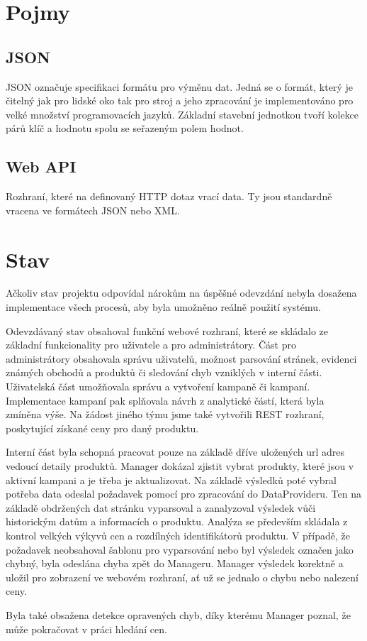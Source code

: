 \documentclass[thesis=B,czech]{FITthesis}[2012/06/26]
\begin{document}
\section{Pojmy}

\subsection{JSON}
JSON označuje specifikaci formátu pro výměnu dat\cite{JSON}. Jedná se o formát, který je čitelný jak pro lidské oko tak pro stroj\cite{JSON} a jeho zpracování je implementováno pro velké množství programovacích jazyků\cite{JSON-impl}. Základní stavební jednotkou
tvoří kolekce párů klíč a hodnotu spolu se seřazeným polem hodnot.

\subsection{Web API}
Rozhraní, které na definovaný HTTP dotaz vrací data. Ty jsou standardně vracena ve formátech JSON nebo XML.

\section{Stav}
Ačkoliv stav projektu odpovídal nárokům na úspěšné odevzdání nebyla dosažena implementace všech procesů, aby byla umožněno reálně
použití systému.
\par
Odevzdávaný stav obsahoval funkční webové rozhraní, které se skládalo ze základní funkcionality pro uživatele a pro administrátory.
Část pro administrátory obsahovala správu uživatelů, možnost parsování stránek, evidenci známých obchodů a produktů či sledování
chyb vzniklých v interní části.
Uživatelská část umožňovala správu a vytvoření kampaně či kampaní. Implementace kampaní pak splňovala návrh z analytické částí,
která byla zmíněna výše.
Na žádost jiného týmu jsme také vytvořili REST rozhraní, poskytující získané ceny pro daný produktu.
\par
Interní část byla schopná pracovat pouze na základě dříve uložených url adres vedoucí detaily produktů. 
Manager dokázal zjistit vybrat produkty, které jsou v aktivní kampani a je třeba je aktualizovat.
Na základě výsledků poté vybral potřeba data odeslal požadavek pomocí pro zpracování do DataProvideru. Ten na základě obdržených dat stránku vyparsoval a zanalyzoval výsledek vůči historickým datům
a informacích o produktu. Analýza se především skládala z kontrol velkých výkyvů cen a rozdílných identifikátorů produktu.
V případě, že požadavek neobsahoval šablonu pro vyparsování nebo byl výsledek označen jako chybný, byla odeslána chyba
zpět do Manageru. Manager výsledek korektně a uložil pro zobrazení ve webovém rozhraní, ať už se jednalo o chybu
nebo nalezení ceny.
\par
Byla také obsažena detekce opravených chyb, díky kterému Manager poznal, že může pokračovat v práci hledání cen.
\end{document}

